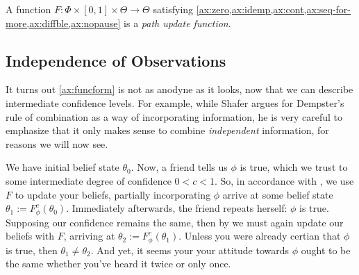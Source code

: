 
\begin{defn}
	A function $F: \Phi \times [0,1] \times \Theta \to \Theta$ 
	satisfying
	\cref{ax:zero,ax:idemp,ax:cont,ax:seq-for-more,ax:diffble,ax:nopause}
	is 
	a \emph{path update function}.
\end{defn}




\subsection{Independence of Observations}
It turns out \cref{ax:funcform} is not as anodyne as it
looks, now that we can describe intermediate confidence levels. 
For example, while Shafer argues for Dempster's rule of combination
as a way of incorporating information, he is very careful to emphasize
that it only makes sense to combine \emph{independent} information,
for reasons we will now see.

\begin{example}\label{ex:dupl}
	We have initial belief state $\theta_0$.
	Now, a friend tells us $\phi$ is true, 
	which we trust to some intermediate degree of confidence 
	$0 < c < 1$. 
	So, in accordance with , we use $F$ to update your beliefs, partially incorporating $\phi$ arrive at some belief state $\theta_1 := F^c_\phi(\theta_0)$.
	Immediately afterwards, the friend repeats herself: $\phi$ is true.
	Supposing our
 	confidence remains the same,
	then by 
	we must again update our beliefs with $F$,
	arriving at $\theta_2 := F^c_\phi(\theta_1)$.
	Unless you were already certian that $\phi$ is true, then $\theta_1 \ne \theta_2$.
	And yet, it seems your your attitude towards $\phi$ ought to be the same whether you've heard it twice or only once.
\end{example}

